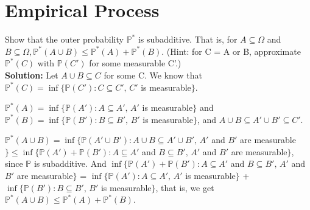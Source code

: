 \documentclass[11pt,letterpaper]{article}                  %
\begin{document}
\bigskip
\begin{problem}

\end{problem}

\bigskip
\begin{problem}

\end{problem}

\bigskip
\begin{problem}

\end{problem}

\bigskip
\begin{problem}

\end{problem}

\section{Empirical Process}

\begin{problem} Show that the outer probability $\mathbb{P}^*$ is subadditive. That is, for $A \subseteq \Omega$ and $B \subseteq \Omega, \mathbb{P}^*(A \cup B) \leq \mathbb{P}^*(A) + \mathbb{P}^*(B)$. (Hint: for C = A or B, approximate $\mathbb{P}^*(C)$ with $\mathbb{P}(C')$ for some measurable C'.) \\
	
	\textbf{Solution:}  Let $A \cup B \subseteq C$ for some C. We know that $\mathbb{P}^*(C) = \inf \{\mathbb{P}(C'): C \subseteq C', \, C'$ is measurable$\}$. 
	
	$\mathbb{P}^*(A) = \inf \{\mathbb{P}(A'): A \subseteq A', \, A'$ is measurable$\}$ and $\mathbb{P}^*(B) = \inf \{\mathbb{P}(B'): B \subseteq B', \, B'$ is measurable$\}$, and $A \cup B \subseteq A' \cup B' \subseteq C'$. 
	
	$\mathbb{P}^*(A \cup B) = \inf \{\mathbb{P}(A' \cup B'): A \cup B \subseteq A' \cup B', \, A'$ and $B'$ are measurable$\} \leq \inf \{\mathbb{P}(A') +  \mathbb{P}(B'): A \subseteq A'$ and $B \subseteq B', \, A'$ and $B'$ are measurable$\}$, since $\mathbb{P}$ is subadditive. And $\inf \{\mathbb{P}(A') +  \mathbb{P}(B'): A \subseteq A'$ and $B \subseteq B', \, A'$ and $B'$ are measurable$\}$ = $\inf \{\mathbb{P}(A'): A \subseteq A', \, A'$ is measurable$\}$ + $\inf \{\mathbb{P}(B'): B \subseteq B', \, B'$ is measurable$\}$, that is, we get $\mathbb{P}^*(A \cup B) \leq \mathbb{P}^*(A) + \mathbb{P}^*(B)$.
\end{problem}
\end{document}
